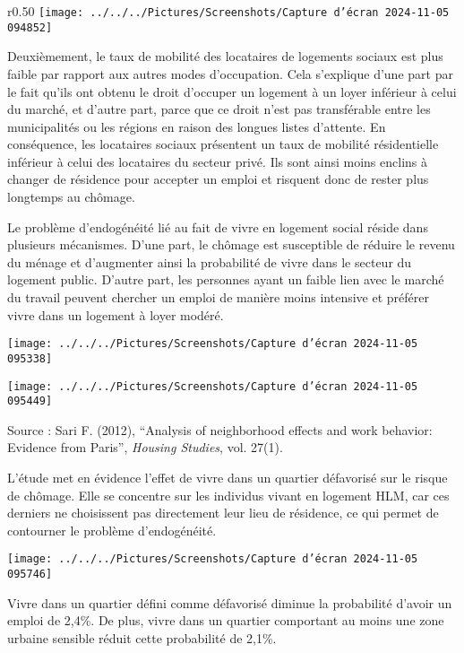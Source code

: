 \documentclass[a4paper, 12pt]{report}
\begin{document}
\begin{wrapfigure}{r}{0.50\textwidth}
	\centering
	\texttt{[image: ../../../Pictures/Screenshots/Capture d'écran 2024-11-05 094852]}
\end{wrapfigure}

Deuxièmement, le taux de mobilité des locataires de logements sociaux est plus faible par rapport aux autres modes d'occupation. Cela s'explique d'une part par le fait qu'ils ont obtenu le droit d'occuper un logement à un loyer inférieur à celui du marché, et d'autre part, parce que ce droit n'est pas transférable entre les municipalités ou les régions en raison des longues listes d'attente. En conséquence, les locataires sociaux présentent un taux de mobilité résidentielle inférieur à celui des locataires du secteur privé. Ils sont ainsi moins enclins à changer de résidence pour accepter un emploi et risquent donc de rester plus longtemps au chômage.

Le problème d’endogénéité lié au fait de vivre en logement social réside dans plusieurs mécanismes. D'une part, le chômage est susceptible de réduire le revenu du ménage et d'augmenter ainsi la probabilité de vivre dans le secteur du logement public. D'autre part, les personnes ayant un faible lien avec le marché du travail peuvent chercher un emploi de manière moins intensive et préférer vivre dans un logement à loyer modéré.

\begin{center}
	\texttt{[image: ../../../Pictures/Screenshots/Capture d'écran 2024-11-05 095338]}

\texttt{[image: ../../../Pictures/Screenshots/Capture d'écran 2024-11-05 095449]}
\end{center}
\newpage
\noindent Source : Sari F. (2012), “Analysis of neighborhood effects and work behavior: Evidence from Paris”, \textit{Housing Studies}, vol. 27(1).

L'étude met en évidence l'effet de vivre dans un quartier défavorisé sur le risque de chômage. Elle se concentre sur les individus vivant en logement HLM, car ces derniers ne choisissent pas directement leur lieu de résidence, ce qui permet de contourner le problème d’endogénéité.

\begin{center}
	\texttt{[image: ../../../Pictures/Screenshots/Capture d'écran 2024-11-05 095746]}
\end{center}

Vivre dans un quartier défini comme défavorisé diminue la probabilité d'avoir un emploi de 2,4\%. De plus, vivre dans un quartier comportant au moins une zone urbaine sensible réduit cette probabilité de 2,1\%.
\end{document}
